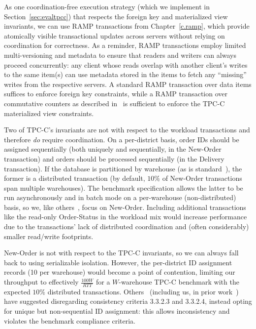 As one coordination-free execution strategy (which we implement in
Section~\ref{sec:evaltpcc}) that respects the foreign key and
materialized view invariants, we can use RAMP transactions from
Chapter~\ref{c.ramp}, which provide atomically visible transactional
updates across servers without relying on coordination for
correctness. As a reminder, RAMP transactions employ limited
multi-versioning and metadata to ensure that readers and writers can
always proceed concurrently: any client whose reads overlap with
another client's writes to the same item(s) can use metadata stored in
the items to fetch any ``missing'' writes from the respective
servers. A standard RAMP transaction over data items suffices to
enforce foreign key constraints, while a RAMP transaction over
commutative counters as described in~\cite{ramp-sigmod14} is sufficient to
enforce the TPC-C materialized view constraints.

Two of TPC-C's invariants are not \iconfluent with respect to the
workload transactions and therefore \textit{do} require
coordination. On a per-district basis, order IDs should be assigned
sequentially (both uniquely and sequentially, in the New-Order
transaction) and orders should be processed sequentially (in the
Delivery transaction). If the database is partitioned by warehouse (as
is standard~\cite{silo,calvin,hstore}), the former is a distributed
transaction (by default, $10\%$ of New-Order transactions span
multiple warehouses). The benchmark specification allows the latter to
be run asynchronously and in batch mode on a per-warehouse
(non-distributed) basis, so we, like others~\cite{calvin,silo}, focus
on New-Order. Including additional transactions like the read-only
Order-Status in the workload mix would increase performance due to the
transactions' lack of distributed coordination and (often
considerably) smaller read/write footprints.

 New-Order is not
\iconfluent with respect to the TPC-C invariants, so we can always
fall back to using serializable isolation. However, the per-district
ID assignment records (10 per warehouse) would become a point of contention,
limiting our throughput to effectively $\frac{100W}{RTT}$ for a
$W$-warehouse TPC-C benchmark with the expected $10\%$ distributed
transactions. Others~\cite{silo} (including us, in prior
work~\cite{hat-vldb}) have suggested disregarding consistency criteria
3.3.2.3 and 3.3.2.4, instead opting for unique but non-sequential ID
assignment: this allows inconsistency and violates the benchmark
compliance criteria.

